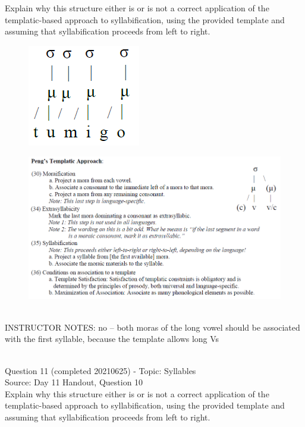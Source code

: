 \documentclass[12pt]{article}
\begin{document}
Explain why this structure either is or is not a correct application of the templatic-based approach to syllabification, using the provided template and assuming that syllabification proceeds from left to right.\\

\begin{figure}[H]
\includegraphics{../images/pengtemplate_tuumigo_no.png}
\end{figure}
\begin{figure}[H]
\includegraphics{../images/peng_template_withdiagram.png}
\end{figure}

~\\
INSTRUCTOR NOTES: no -- both moras of the long vowel should be associated with the first syllable, because the template allows long Vs


~\\

{\large Question 11} (completed 20210625) - Topic: Syllables\\
Source: Day 11 Handout, Question 10\\

Explain why this structure either is or is not a correct application of the templatic-based approach to syllabification, using the provided template and assuming that syllabification proceeds from left to right.\\
\end{document}
